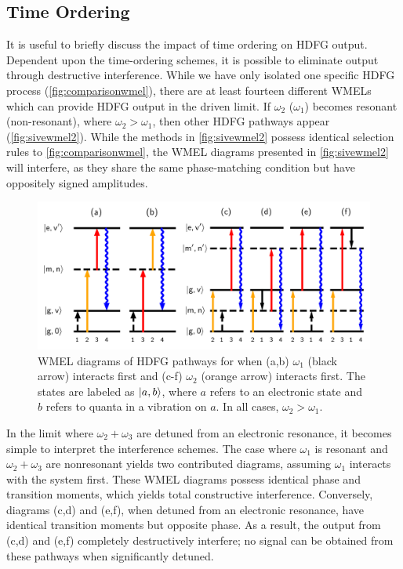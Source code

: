 \documentclass[aip, jcp, reprint, onecolumn]{revtex4-2}
\begin{document}
\subsection{Time Ordering}
It is useful to briefly discuss the impact of time ordering on HDFG output.
Dependent upon the time-ordering schemes, it is possible to eliminate output through destructive interference.
While we have only isolated one specific HDFG process (\autoref{fig:comparisonwmel}), there are at least fourteen different WMELs which can provide HDFG output in the driven limit. \cite{RN352}
If $\omega_2$ ($\omega_1$) becomes resonant (non-resonant), where $\omega_2 > \omega_1$, then other HDFG pathways appear (\autoref{fig:sivewmel2}).\cite{McDonnell2024} 
While the methods in \autoref{fig:sivewmel2} possess identical selection rules to \autoref{fig:comparisonwmel}, the WMEL diagrams presented in \autoref{fig:sivewmel2} will interfere, as they share the same phase-matching condition but have oppositely signed amplitudes.
\begin{figure}[!htbp]
	\centering
	\includegraphics[width=6.66 in]{figures/timeorderedwmel.png}
	\caption{WMEL diagrams of HDFG pathways for when (a,b) $\omega_1$ (black arrow) interacts first and (c-f) $\omega_2$ (orange arrow) interacts first. 
		The states are labeled as $\ket{a,b}$, where $a$ refers to an electronic state and $b$ refers to quanta in a vibration on $a$.
		In all cases, $\omega_2 > \omega_1$.
	}
	\label{fig:sivewmel2}
\end{figure}

In the limit where $\omega_2+\omega_3$ are detuned from an electronic resonance, it becomes simple to interpret the interference schemes. 
The case where $\omega_1$ is resonant and $\omega_2 + \omega_3$ are nonresonant yields two contributed diagrams, assuming $\omega_1$ interacts with the system first.
These WMEL diagrams possess identical phase and transition moments, which yields total constructive interference.
Conversely, diagrams (c,d) and (e,f), when detuned from an electronic resonance, have identical transition moments but opposite phase. 
As a result, the output from (c,d) and (e,f) completely destructively interfere; no signal can be obtained from these pathways when significantly detuned. \cite{RN287, McDonnell2024}
\end{document}
